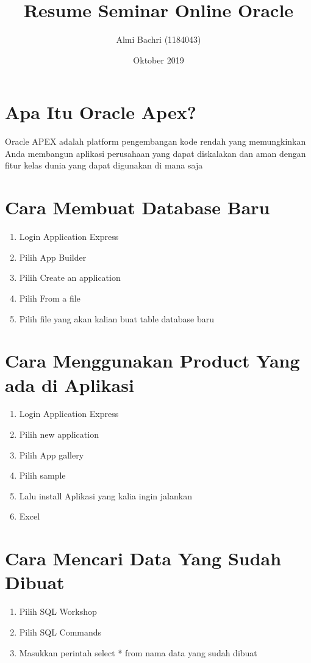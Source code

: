 \documentclass{article}
\title{Resume Seminar Online Oracle}
\author{Almi Bachri (1184043) }
\date{Oktober 2019}
\begin{document}
\maketitle

\section{Apa Itu Oracle Apex?}
Oracle APEX adalah platform pengembangan kode rendah yang memungkinkan Anda membangun aplikasi perusahaan yang dapat diskalakan dan aman dengan fitur kelas dunia yang dapat digunakan di mana saja


\section{Cara Membuat Database Baru}
\begin{enumerate}
    \item Login Application Express 
    \item Pilih App Builder
    \item Pilih Create an application
    \item Pilih From a file
    \item Pilih file yang akan kalian buat table database baru
\end{enumerate}
\section{Cara Menggunakan Product Yang ada di Aplikasi}
\begin{enumerate}
    \item Login Application Express
    \item Pilih new application
    \item Pilih App gallery
    \item Pilih sample
    \item Lalu install Aplikasi yang kalia ingin jalankan
    \item Excel
\end{enumerate}
\section{Cara Mencari Data Yang Sudah Dibuat}
\begin{enumerate}
    \item Pilih SQL Workshop 
    \item Pilih SQL Commands
    \item Masukkan perintah select * from nama data yang sudah dibuat
\end{enumerate}
\end{document}
